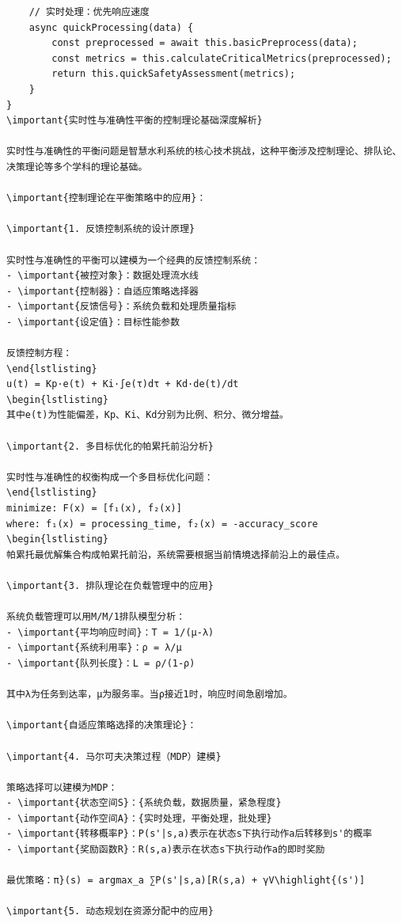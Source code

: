 \begin{verbatim}
    // 实时处理：优先响应速度
    async quickProcessing(data) {
        const preprocessed = await this.basicPreprocess(data);
        const metrics = this.calculateCriticalMetrics(preprocessed);
        return this.quickSafetyAssessment(metrics);
    }
}
\important{实时性与准确性平衡的控制理论基础深度解析}

实时性与准确性的平衡问题是智慧水利系统的核心技术挑战，这种平衡涉及控制理论、排队论、决策理论等多个学科的理论基础。

\important{控制理论在平衡策略中的应用}：

\important{1. 反馈控制系统的设计原理}

实时性与准确性的平衡可以建模为一个经典的反馈控制系统：
- \important{被控对象}：数据处理流水线
- \important{控制器}：自适应策略选择器
- \important{反馈信号}：系统负载和处理质量指标
- \important{设定值}：目标性能参数

反馈控制方程：
\end{lstlisting}
u(t) = Kp·e(t) + Ki·∫e(τ)dτ + Kd·de(t)/dt
\begin{lstlisting}
其中e(t)为性能偏差，Kp、Ki、Kd分别为比例、积分、微分增益。

\important{2. 多目标优化的帕累托前沿分析}

实时性与准确性的权衡构成一个多目标优化问题：
\end{lstlisting}
minimize: F(x) = [f₁(x), f₂(x)]
where: f₁(x) = processing_time, f₂(x) = -accuracy_score
\begin{lstlisting}
帕累托最优解集合构成帕累托前沿，系统需要根据当前情境选择前沿上的最佳点。

\important{3. 排队理论在负载管理中的应用}

系统负载管理可以用M/M/1排队模型分析：
- \important{平均响应时间}：T = 1/(μ-λ)
- \important{系统利用率}：ρ = λ/μ
- \important{队列长度}：L = ρ/(1-ρ)

其中λ为任务到达率，μ为服务率。当ρ接近1时，响应时间急剧增加。

\important{自适应策略选择的决策理论}：

\important{4. 马尔可夫决策过程（MDP）建模}

策略选择可以建模为MDP：
- \important{状态空间S}：{系统负载，数据质量，紧急程度}
- \important{动作空间A}：{实时处理，平衡处理，批处理}
- \important{转移概率P}：P(s'|s,a)表示在状态s下执行动作a后转移到s'的概率
- \important{奖励函数R}：R(s,a)表示在状态s下执行动作a的即时奖励

最优策略：π}(s) = argmax_a ∑P(s'|s,a)[R(s,a) + γV\highlight{(s')]

\important{5. 动态规划在资源分配中的应用}


\end{verbatim}
